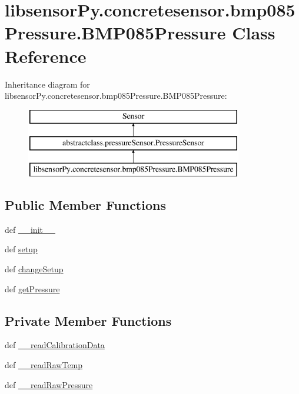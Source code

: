 \hypertarget{classlibsensorPy_1_1concretesensor_1_1bmp085Pressure_1_1BMP085Pressure}{}\section{libsensor\+Py.\+concretesensor.\+bmp085\+Pressure.\+B\+M\+P085\+Pressure Class Reference}
\label{classlibsensorPy_1_1concretesensor_1_1bmp085Pressure_1_1BMP085Pressure}
Inheritance diagram for libsensor\+Py.\+concretesensor.\+bmp085\+Pressure.\+B\+M\+P085\+Pressure\+:\begin{figure}[H]
\begin{center}
\leavevmode
\includegraphics[height=3.000000cm]{classlibsensorPy_1_1concretesensor_1_1bmp085Pressure_1_1BMP085Pressure}
\end{center}
\end{figure}
\subsection*{Public Member Functions}
\begin{DoxyCompactItemize}
\item 
def \hyperlink{classlibsensorPy_1_1concretesensor_1_1bmp085Pressure_1_1BMP085Pressure_ae36fd62a1763e243d56f01ff0ab64388}{\+\_\+\+\_\+init\+\_\+\+\_\+}
\item 
def \hyperlink{classlibsensorPy_1_1concretesensor_1_1bmp085Pressure_1_1BMP085Pressure_a87ea464fa2c56cf3933deb107a44ce4c}{setup}
\item 
def \hyperlink{classlibsensorPy_1_1concretesensor_1_1bmp085Pressure_1_1BMP085Pressure_a77bb631d800b4a12fc2d39340dfccb51}{change\+Setup}
\item 
def \hyperlink{classlibsensorPy_1_1concretesensor_1_1bmp085Pressure_1_1BMP085Pressure_a9b5e4b98e51aea7378373dd4bb3fb216}{get\+Pressure}
\end{DoxyCompactItemize}
\subsection*{Private Member Functions}
\begin{DoxyCompactItemize}
\item 
def \hyperlink{classlibsensorPy_1_1concretesensor_1_1bmp085Pressure_1_1BMP085Pressure_a3d64f2711a008c4349d6ef8039439f6f}{\+\_\+\+\_\+read\+Calibration\+Data}
\item 
def \hyperlink{classlibsensorPy_1_1concretesensor_1_1bmp085Pressure_1_1BMP085Pressure_ac676a297296a5cbf2a604594cfcc016f}{\+\_\+\+\_\+read\+Raw\+Temp}
\item 
def \hyperlink{classlibsensorPy_1_1concretesensor_1_1bmp085Pressure_1_1BMP085Pressure_adbaf8293f57b5e044b49549ccd213df8}{\+\_\+\+\_\+read\+Raw\+Pressure}
\end{DoxyCompactItemize}
